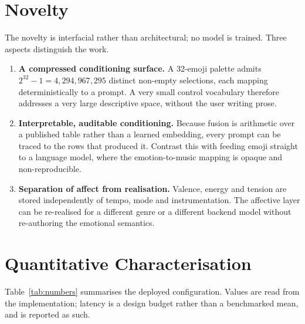 \documentclass[11pt]{article}
\begin{document}
\section{Novelty}

The novelty is interfacial rather than architectural; no model is trained.
Three aspects distinguish the work.

\begin{enumerate}[leftmargin=*, itemsep=2pt, topsep=3pt]
\item \textbf{A compressed conditioning surface.} A 32-emoji palette admits
$2^{32}-1 = 4{,}294{,}967{,}295$ distinct non-empty selections, each mapping
deterministically to a prompt. A very small control vocabulary therefore
addresses a very large descriptive space, without the user writing prose.

\item \textbf{Interpretable, auditable conditioning.} Because fusion is
arithmetic over a published table rather than a learned embedding, every
prompt can be traced to the rows that produced it. Contrast this with feeding
emoji straight to a language model, where the emotion-to-music mapping is
opaque and non-reproducible.

\item \textbf{Separation of affect from realisation.} Valence, energy and
tension are stored independently of tempo, mode and instrumentation. The
affective layer can be re-realised for a different genre or a different
backend model without re-authoring the emotional semantics.
\end{enumerate}

\section{Quantitative Characterisation}
\label{sec:numbers}

Table~\ref{tab:numbers} summarises the deployed configuration. Values are
read from the implementation; latency is a design budget rather than a
benchmarked mean, and is reported as such.
\end{document}
